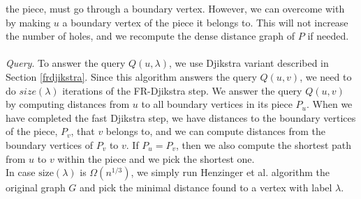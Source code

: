 the piece, must go through a boundary vertex. However, we can overcome with by making $u$
a boundary vertex of the piece it belongs to. This will not increase the number of holes,
and we recompute the dense distance graph of $P$ if needed. \\
\\
\indent \textit{Query}. To answer the query $Q(u,\lambda)$, we use Djikstra variant
described in Section \ref{frdjikstra}. Since this algorithm answers the query $Q(u,v)$,
we need to do $size(\lambda)$ iterations of the FR-Djikstra step. We answer the query
$Q(u,v)$ by computing distances from $u$ to all boundary vertices in its piece $P_u$.
When we have completed the fast Djikstra step, we have distances to the boundary vertices
of the piece, $P_v$, that $v$ belongs to, and we can compute distances from the boundary
vertices of $P_v$ to $v$. If $P_u=P_v$, then we also compute the shortest path from $u$
to $v$ within the piece and we pick the shortest one. \\
In case $\text{size}(\lambda)$ is $\Omega(n^{1/3})$, we simply run Henzinger et al.
\cite{henzinger1997faster} algorithm the original graph $G$ and pick the minimal distance
found to a vertex with label $\lambda$.

